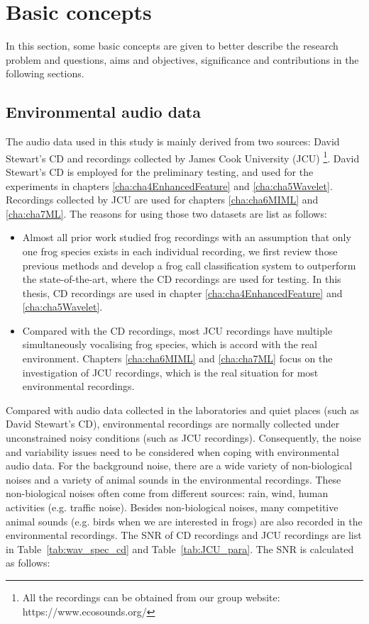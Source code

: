 \section{Basic concepts} 
In this section, some basic concepts are given to better describe the research problem and questions, aims and objectives, significance and contributions in the following sections.

\subsection{Environmental audio data}
The audio data used in this study is mainly derived from two sources: David Stewart's CD \citep{CD} and recordings collected by James Cook University (JCU) \footnote{All the recordings can be obtained from our group website: https://www.ecosounds.org/}. 
David Stewart's CD is employed for the preliminary testing, and used for the experiments in chapters \ref{cha:cha4EnhancedFeature} and \ref{cha:cha5Wavelet}. 
Recordings collected by JCU are used for chapters \ref{cha:cha6MIML} and \ref{cha:cha7ML}. 
The reasons for using those two datasets are list as follows:
\begin{itemize}
\item  Almost all prior work studied frog recordings with an assumption that only one frog species exists in each individual recording, we first review those previous methods and develop a frog call classification system to outperform the state-of-the-art, where the CD recordings are used for testing. In this thesis, CD recordings are used in chapter \ref{cha:cha4EnhancedFeature} and \ref{cha:cha5Wavelet}.


\item  Compared with the CD recordings, most JCU recordings have multiple simultaneously vocalising frog species, which is accord with the real environment. Chapters \ref{cha:cha6MIML} and \ref{cha:cha7ML} focus on the investigation of JCU recordings, which is the real situation for most environmental recordings. 


\end{itemize}


Compared with audio data collected in the laboratories and quiet places (such as David Stewart’s CD), environmental recordings are normally collected under unconstrained noisy conditions (such as JCU recordings). Consequently, the noise and variability issues need to be considered when coping with environmental audio data. 
For the background noise, there are a wide variety of non-biological noises and a variety of animal sounds in the environmental recordings. These non-biological noises often come from different sources: rain, wind, human activities (e.g. traffic noise). Besides non-biological noises, many competitive animal sounds (e.g. birds when we are interested in frogs) are also recorded in the environmental  recordings. The SNR of CD recordings and JCU recordings are list in 
Table~\ref{tab:wav_spec_cd} and Table~\ref{tab:JCU_para}. The SNR is calculated as follows:

